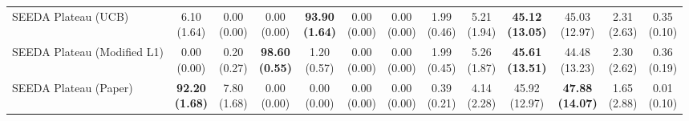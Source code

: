 \begin{table}[H]
{\begin{tabular}{l|cccccc|cccccc}
SEEDA Plateau (UCB) & \makecell{6.10 \\ (1.64)} & \makecell{0.00 \\ (0.00)} & {\cellcolor[HTML]{C8E6C9}} \makecell{0.00 \\ (0.00)} & \bfseries \makecell{93.90 \\ (1.64)} & \makecell{0.00 \\ (0.00)} & \makecell{0.00 \\ (0.00)} & \makecell{1.99 \\ (0.46)} & \makecell{5.21 \\ (1.94)} & {\cellcolor[HTML]{C8E6C9}} \bfseries \makecell{45.12 \\ (13.05)} & \makecell{45.03 \\ (12.97)} & \makecell{2.31 \\ (2.63)} & \makecell{0.35 \\ (0.10)} \\
SEEDA Plateau (Modified L1) & \makecell{0.00 \\ (0.00)} & \makecell{0.20 \\ (0.27)} & {\cellcolor[HTML]{C8E6C9}} \bfseries \makecell{98.60 \\ (0.55)} & \makecell{1.20 \\ (0.57)} & \makecell{0.00 \\ (0.00)} & \makecell{0.00 \\ (0.00)} & \makecell{1.99 \\ (0.45)} & \makecell{5.26 \\ (1.87)} & {\cellcolor[HTML]{C8E6C9}} \bfseries \makecell{45.61 \\ (13.51)} & \makecell{44.48 \\ (13.23)} & \makecell{2.30 \\ (2.62)} & \makecell{0.36 \\ (0.19)} \\
SEEDA Plateau (Paper) & \bfseries \makecell{92.20 \\ (1.68)} & \makecell{7.80 \\ (1.68)} & {\cellcolor[HTML]{C8E6C9}} \makecell{0.00 \\ (0.00)} & \makecell{0.00 \\ (0.00)} & \makecell{0.00 \\ (0.00)} & \makecell{0.00 \\ (0.00)} & \makecell{0.39 \\ (0.21)} & \makecell{4.14 \\ (2.28)} & {\cellcolor[HTML]{C8E6C9}} \makecell{45.92 \\ (12.97)} & \bfseries \makecell{47.88 \\ (14.07)} & \makecell{1.65 \\ (2.88)} & \makecell{0.01 \\ (0.10)} \\
\bottomrule
\end{tabular}
}%
\end{table}
